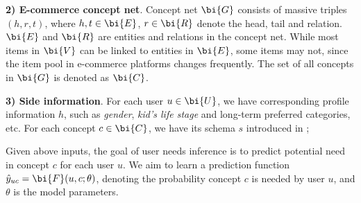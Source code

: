 \noindent
\textbf{2) E-commerce concept net}. Concept net $\bi{G}$ consists of massive triples $(h, r, t)$, 
where $h, t\in \bi{E}$, $r\in \bi{R}$ denote the head, tail and relation.
$\bi{E}$ and $\bi{R}$ are entities and relations in the concept net.
While most items in $\bi{V}$ can be linked to entities in $\bi{E}$, 
some items may not, since the item pool in e-commerce platforms changes frequently. 
The set of all concepts in $\bi{G}$ is denoted as $\bi{C}$.

\noindent
\textbf{3) Side information}. 
For each user $u\in \bi{U}$, we have corresponding profile information $h$, 
such as \textit{gender}, \textit{kid's life stage} and long-term preferred categories, etc.
For each concept $c\in \bi{C}$, we have its schema $s$ introduced in ;


Given above inputs, the goal of user needs inference is to predict potential need in concept $c$ for each user $u$. We aim to learn a prediction function $\hat y_{uc} = \bi{F}(u, c; \theta)$, denoting the probability concept $c$ is needed by user $u$, and $\theta$ is the model parameters.

